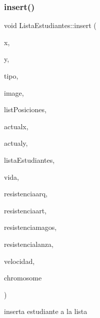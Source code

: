 \subsubsection{\texorpdfstring{insert()}{insert()}}
{\footnotesize\ttfamily void Lista\+Estudiantes\+::insert (\begin{DoxyParamCaption}\item[{int}]{x,  }\item[{int}]{y,  }\item[{string}]{tipo,  }\item[{Gtk\+Widget $\ast$}]{image,  }\item[{\hyperlink{classList__Posiciones}{List\+\_\+\+Posiciones} $\ast$}]{list\+Posiciones,  }\item[{double}]{actualx,  }\item[{double}]{actualy,  }\item[{\hyperlink{classListaEstudiantes}{Lista\+Estudiantes} $\ast$}]{lista\+Estudiantes,  }\item[{int}]{vida,  }\item[{int}]{resistenciaarq,  }\item[{int}]{resistenciaart,  }\item[{int}]{resistenciamagos,  }\item[{int}]{resistencialanza,  }\item[{int}]{velocidad,  }\item[{string}]{chromosome }\end{DoxyParamCaption})\hspace{0.3cm}{\ttfamily [inline]}}



inserta estudiante a la lista 



